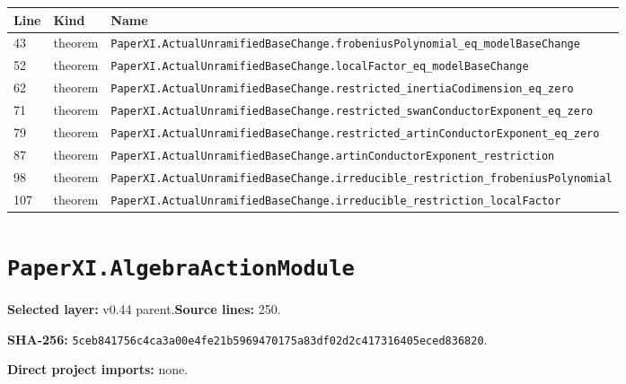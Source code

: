 \documentclass[10pt,oneside]{book}
\begin{document}
\begin{longtable}{@{}p{}p{}p{}@{}}\toprule Line&Kind&Name\\\midrule\endhead

43&theorem&\nolinkurl{PaperXI.ActualUnramifiedBaseChange.frobeniusPolynomial_eq_modelBaseChange}\\

52&theorem&\nolinkurl{PaperXI.ActualUnramifiedBaseChange.localFactor_eq_modelBaseChange}\\

62&theorem&\nolinkurl{PaperXI.ActualUnramifiedBaseChange.restricted_inertiaCodimension_eq_zero}\\

71&theorem&\nolinkurl{PaperXI.ActualUnramifiedBaseChange.restricted_swanConductorExponent_eq_zero}\\

79&theorem&\nolinkurl{PaperXI.ActualUnramifiedBaseChange.restricted_artinConductorExponent_eq_zero}\\

87&theorem&\nolinkurl{PaperXI.ActualUnramifiedBaseChange.artinConductorExponent_restriction}\\

98&theorem&\nolinkurl{PaperXI.ActualUnramifiedBaseChange.irreducible_restriction_frobeniusPolynomial}\\

107&theorem&\nolinkurl{PaperXI.ActualUnramifiedBaseChange.irreducible_restriction_localFactor}\\

\bottomrule\end{longtable}

\section{\texorpdfstring{\nolinkurl{PaperXI.AlgebraActionModule}}{PaperXI.AlgebraActionModule}}\label{module:PaperXI.AlgebraActionModule}

\textbf{Selected layer:} v0.44 parent.\quad\textbf{Source lines:} 250.\par\textbf{SHA-256:} {\scriptsize\nolinkurl{5ceb841756c4ca3a00e4fe21b5969470175a83df02d2c417316405eced836820}}.


\textbf{Direct project imports:} none.
\end{document}
